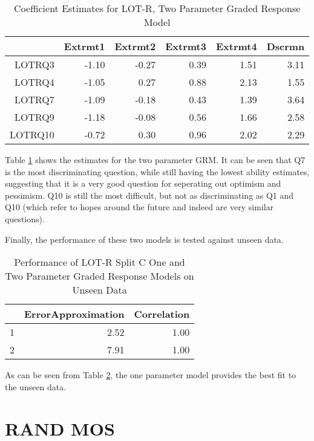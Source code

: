\documentclass{article}
\begin{document}
\begin{table}[ht]
\centering
\begin{tabular}{rrrrrr}
  \hline
 & Extrmt1 & Extrmt2 & Extrmt3 & Extrmt4 & Dscrmn \\ 
  \hline
LOTRQ3 & -1.10 & -0.27 & 0.39 & 1.51 & 3.11 \\ 
  LOTRQ4 & -1.05 & 0.27 & 0.88 & 2.13 & 1.55 \\ 
  LOTRQ7 & -1.09 & -0.18 & 0.43 & 1.39 & 3.64 \\ 
  LOTRQ9 & -1.18 & -0.08 & 0.56 & 1.66 & 2.58 \\ 
  LOTRQ10 & -0.72 & 0.30 & 0.96 & 2.02 & 2.29 \\ 
   \hline
\end{tabular}
\caption{Coefficient Estimates for LOT-R, Two Parameter Graded Response Model} 
\label{tab:lotr2cgrm2pl}
\end{table}
Table \ref{tab:lotr2cgrm2pl} shows the estimates for the two parameter GRM. It can be seen that Q7 is  the most discriminating question, while still having the lowest ability estimates, suggesting that it is a very good question for seperating out optimism and pessimism. Q10 is still the most difficult, but not as discriminating as Q1 and Q10 (which refer to hopes around the future and indeed are very similar questions). 

Finally, the performance of these two models is tested against unseen data. 

\begin{table}[ht]
\centering
\begin{tabular}{rrr}
  \hline
 & ErrorApproximation & Correlation \\ 
  \hline
1 & 2.52 & 1.00 \\ 
  2 & 7.91 & 1.00 \\ 
   \hline
\end{tabular}
\caption{Performance of LOT-R Split C One and Two Parameter Graded Response Models on Unseen Data} 
\label{tab:lotr2cgrmtest}
\end{table}

As can be seen from Table \ref{tab:lotr2cgrmtest}, the one parameter model provides the best fit to the unseen data. 


\section{RAND MOS}
\label{sec:rand-mos}
\end{document}
